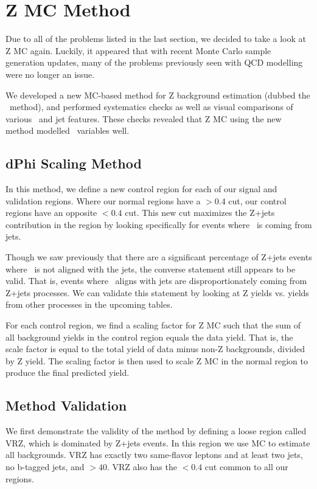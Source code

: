 \section{Z MC Method}

Due to all of the problems listed in the last section, we decided to take a look at Z MC again. Luckily, it appeared that with recent Monte Carlo sample generation updates, many of the problems previously seen with QCD modelling were no longer an issue.

We developed a new MC-based method for Z background estimation (dubbed the \mindphijm\ method), and performed systematics checks as well as visual comparisons of various \MET\ and jet features. These checks revealed that Z MC using the new method modelled \MET\ variables well.

\subsection*{dPhi Scaling Method}

In this method, we define a new control region for each of our signal and validation regions. Where our normal regions have a \mindphijm$>0.4$ cut, our control regions have an opposite \mindphijm$<0.4$ cut. This new cut maximizes the Z+jets contribution in the region by looking specifically for events where \MET\ is coming from jets.

Though we saw previously that there are a significant percentage of Z+jets events where \MET\ is not aligned with the jets, the converse statement still appears to be valid. That is, events where \MET\ aligns with jets are disproportionately coming from Z+jets processes. We can validate this statement by looking at Z yields vs. yields from other processes in the upcoming tables.

For each control region, we find a scaling factor for Z MC such that the sum of all background yields in the control region equals the data yield. That is, the scale factor is equal to the total yield of data minus non-Z backgrounds, divided by Z yield. The scaling factor is then used to scale Z MC in the normal region to produce the final predicted yield.

\subsection*{Method Validation}

We first demonstrate the validity of the method by defining a loose region called VRZ, which is dominated by Z+jets events. In this region we use MC to estimate all backgrounds. VRZ has exactly two same-flavor leptons and at least two jets, no b-tagged jets, and \ptll$>40$. VRZ also has the \mindphijm$<0.4$ cut common to all our regions.

